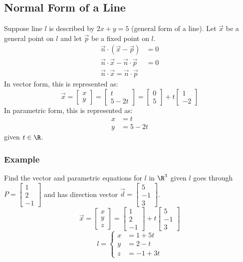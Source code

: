 \documentclass[letterpaper, 12pt]{math}
\begin{document}
\subsection*{Normal Form of a Line}
Suppose line \( l \) is described by \( 2x+y = 5 \) (general form of a line).
Let \( \vec{x} \) be a general point on \( l \) and let \( \vec{p} \) be a
fixed point on \( l \).
\begin{align*}
  \vec{n}\cdot(\vec{x}-\vec{p}) &= 0 \\
  \vec{n}\cdot\vec{x}-\vec{n}\cdot\vec{p} &= 0 \\
  \vec{n}\cdot\vec{x} = \vec{n}\cdot\vec{p}
\end{align*}
In vector form, this is represented as:
\[ \vec{x} = \begin{bmatrix}x \\ y\end{bmatrix} =
  \begin{bmatrix}t \\ 5-2t\end{bmatrix} =
  \begin{bmatrix}0 \\ 5\end{bmatrix}+
  t\begin{bmatrix}1 \\ -2\end{bmatrix} \]
In parametric form, this is represented as:
\begin{align*}
  x &= t \\
  y &= 5-2t
\end{align*}
given \( t\in\R \).

\subsubsection*{Example}
Find the vector and parametric equations for \( l \) in \( \R^3 \) given \( l \)
goes through \( P = \begin{bmatrix}1 \\ 2 \\ -1\end{bmatrix} \) and has
direction vector \( \vec{d} = \begin{bmatrix}5 \\ -1 \\ 3\end{bmatrix} \).
\[ \vec{x} = \begin{bmatrix}x \\ y \\ z\end{bmatrix} =
  \begin{bmatrix}1 \\ 2 \\ -1\end{bmatrix}+
  t\begin{bmatrix}5 \\ -1 \\ 3\end{bmatrix} \]
\[ l = \begin{cases}
  x &= 1+5t \\
  y &= 2-t \\
  z &= -1+3t
\end{cases} \]
\end{document}

